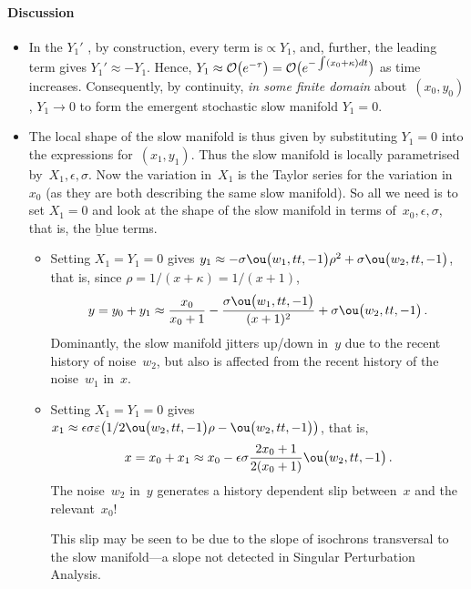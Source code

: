 \paragraph{Discussion}
\begin{itemize}
\item In the \(Y_1'\) \sde, by construction, every term
is\({}\propto Y_1\), and, further, the leading term gives
\(Y_1' \approx -Y_1\). Hence,
\(Y_1 \approx \Ord{e^{-\tau}} =\Ord{e^{-\int(x_0+\kappa)dt}}\)
as time increases. Consequently, by continuity, \emph{in
some finite domain} about~\((x_0,y_0)\), \(Y_1\to 0\) to
form the emergent stochastic slow manifold \(Y_1=0\).

\item The local shape of the slow manifold is thus given by
substituting \(Y_1=0\) into the expressions
for~\((x_1,y_1)\). Thus the slow manifold is locally
parametrised by~\(X_1,\epsilon,\sigma\). Now the variation
in~\(X_1\) is the Taylor series for the variation in~\(x_0\)
(as they are both describing the same slow manifold). So all
we need is to set \(X_1=0\) and look at the shape of the
slow manifold in terms of~\(x_0,\epsilon,\sigma\), that is,
the \b{blue terms}.
\begin{itemize}

\item Setting \(X_1=Y_1=0\) gives \(y_1\approx
-\sigma \ou\big(w_{1},tt,-1\big) \rho ^{2} +\sigma 
\ou\big(w_{2},tt,-1\big)\), that is, since
$\rho=1/(x+\kappa)=1/(x+1)$,
\begin{equation*}
y=y_0+y_1\approx \frac{x_0}{x_0+1}
-\frac{\sigma\ou\big(w_{1},tt,-1\big)}{ (x+1) ^{2}} 
+\sigma  \ou\big(w_{2},tt,-1\big)\,.
\end{equation*}
Dominantly, the slow manifold jitters up/down in~\(y\) due
to the recent history of noise~\(w_2\), but also is affected
from the recent history of the noise~\(w_1\) in~\(x\). 

\item Setting \(X_1=Y_1=0\) gives \(x_1\approx\epsilon 
\sigma  \varepsilon  \big( 1/2 \ou\big(w_{2},tt,-1\big) \rho
-\ou\big(w_{2},tt,-1\big) \big)\), that is, 
\begin{equation*}
x=x_0+x_1 \approx x_0-\epsilon  \sigma   \frac{2x_0+1}{2(x_0+1)}\ou\big(w_{2},tt,-1\big)\,.
\end{equation*}
The noise~\(w_2\) in~\(y\) generates a history dependent
slip between~\(x\) and the relevant~\(x_0\)!  

This slip may be seen to be due to the slope of isochrons
transversal to the slow manifold---a slope not detected in
Singular Perturbation Analysis.


\end{itemize}
\end{itemize}
